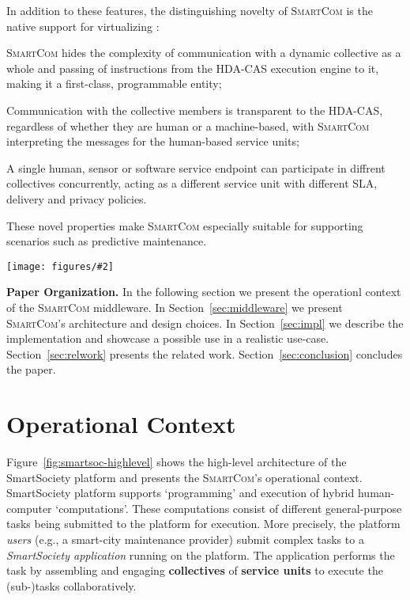 \documentclass{llncs}
\newcommand{\mdl}{\textsc{SmartCom}}
\newcommand{\figtop}[3][0.9]{
\begin{figure*}[h]
\centering
\texttt{[image: figures/\#2]}
\caption{#3}
\label{fig:#2}
\end{figure*}
}
\begin{document}
	In addition to these features, the distinguishing novelty of \mdl{} is the native support for virtualizing : 
	\begin{inparaenum}[i) \itshape]
	\item
	\mdl{} hides the complexity of communication with a dynamic collective as a whole and passing of instructions from the HDA-CAS execution engine to it, making it a first-class, programmable entity; 
	\item 
	Communication with the collective members is transparent to the HDA-CAS, regardless of whether they are human or a machine-based, with \mdl{} interpreting the messages for the human-based service units; 
	\item 
	A single human, sensor or software service endpoint can participate in diffrent collectives concurrently, acting as a different service unit with different SLA, delivery and privacy policies. 
	\end{inparaenum}
	These novel properties make \mdl{} especially suitable for supporting scenarios such as predictive maintenance.


\figtop[.85]{smartsoc-highlevel}{Operational context for the \mdl{} middleware. Middleware components are marked in blue.}


\textbf{Paper Organization. }
  In the following section we present the operationl context of the \mdl{} middleware. In Section~\ref{sec:middleware} we present \mdl's architecture and design choices. In Section~\ref{sec:impl} we  describe the implementation and showcase a possible use in a realistic use-case. Section~\ref{sec:relwork} presents the related work. Section~\ref{sec:conclusion} concludes the paper.


  \section{Operational Context}
    \label{sec:intro:context}

      Figure~\ref{fig:smartsoc-highlevel} shows the high-level architecture of the SmartSociety platform and presents the \mdl's operational context. SmartSociety platform supports `programming' and execution of hybrid human-computer `computations'. These computations consist of different general-purpose tasks being submitted to the platform for execution. More precisely, the platform \emph{users} (e.g., a smart-city maintenance provider) submit complex tasks to a \emph{SmartSociety application} running on the platform. The application performs the task by assembling and engaging \textbf{collectives} of \textbf{service units} to execute the (sub-)tasks collaboratively.
\end{document}
